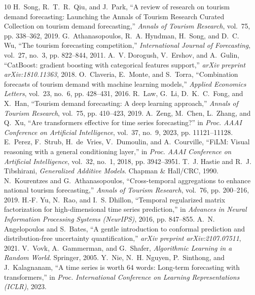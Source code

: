\documentclass[10pt,journal,compsoc]{IEEEtran}
\begin{document}

\begin{thebibliography}{10}
H.~Song, R.~T.~R.~Qiu, and J.~Park, ``A review of research on tourism demand forecasting: Launching the Annals of Tourism Research Curated Collection on tourism demand forecasting,'' \emph{Annals of Tourism Research}, vol.~75, pp. 338--362, 2019.
G.~Athanasopoulos, R.~A. Hyndman, H.~Song, and D.~C. Wu, ``The tourism forecasting competition,'' \emph{International Journal of Forecasting}, vol.~27, no.~3, pp. 822--844, 2011.
A.~V. Dorogush, V.~Ershov, and A.~Gulin, ``CatBoost: gradient boosting with categorical features support,'' \emph{arXiv preprint arXiv:1810.11363}, 2018.
O.~Claveria, E.~Monte, and S.~Torra, ``Combination forecasts of tourism demand with machine learning models,'' \emph{Applied Economics Letters}, vol.~23, no.~6, pp. 428--431, 2016.
R.~Law, G.~Li, D.~K.~C.~Fong, and X.~Han, ``Tourism demand forecasting: A deep learning approach,'' \emph{Annals of Tourism Research}, vol.~75, pp. 410--423, 2019.
A.~Zeng, M.~Chen, L.~Zhang, and Q.~Xu, ``Are transformers effective for time series forecasting?'' in \emph{Proc. AAAI Conference on Artificial Intelligence}, vol.~37, no.~9, 2023, pp. 11121--11128.
E.~Perez, F.~Strub, H.~de~Vries, V.~Dumoulin, and A.~Courville, ``FiLM: Visual reasoning with a general conditioning layer,'' in \emph{Proc. AAAI Conference on Artificial Intelligence}, vol.~32, no.~1, 2018, pp. 3942--3951.
T.~J. Hastie and R.~J. Tibshirani, \emph{Generalized Additive Models}. Chapman \& Hall/CRC, 1990.
N.~Kourentzes and G.~Athanasopoulos, ``Cross-temporal aggregations to enhance national tourism forecasting,'' \emph{Annals of Tourism Research}, vol.~76, pp. 200--216, 2019.
H.-F. Yu, N.~Rao, and I.~S. Dhillon, ``Temporal regularized matrix factorization for high-dimensional time series prediction,'' in \emph{Advances in Neural Information Processing Systems (NeurIPS)}, 2016, pp. 847--855.
A.~N. Angelopoulos and S.~Bates, ``A gentle introduction to conformal prediction and distribution-free uncertainty quantification,'' \emph{arXiv preprint arXiv:2107.07511}, 2021.
V.~Vovk, A.~Gammerman, and G.~Shafer, \emph{Algorithmic Learning in a Random World}. Springer, 2005.
Y.~Nie, N.~H. Nguyen, P.~Sinthong, and J.~Kalagnanam, ``A time series is worth 64 words: Long-term forecasting with transformers,'' in \emph{Proc. International Conference on Learning Representations (ICLR)}, 2023.

\end{thebibliography}
\end{document}
